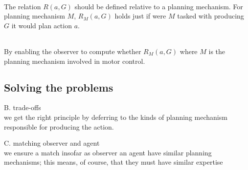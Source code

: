 \documentclass[11pt]{extarticle}
\begin{document}
\begin{multicols}{3}
\theQuestion \\ 
The relation $R(a,G)$ should be defined relative to a planning mechanism.
For planning mechanism $M$, $R{_M}(a,G)$ holds just if were $M$  tasked with producing $G$ it would plan action $a$.


\thePuzzle \\
By enabling the observer to compute whether $R{_M}(a,G)$ where $M$ is the planning mechanism involved in motor control.


\subsection{Solving the problems}

B. trade-offs \\
we get the right principle by deferring to the kinds of planning mechanism responsible for producing the action.

C. matching observer and agent \\
we ensure a match insofar as observer an agent have similar planning mechanisms; this means, of course, that they must have similar expertise

\footnotesize 


\end{multicols}
\end{document}
